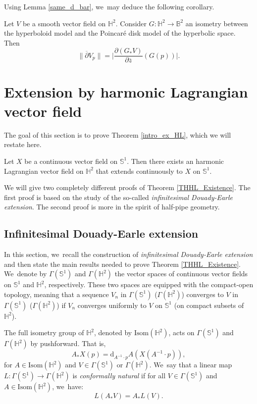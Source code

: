 Using Lemma \ref{same_d_bar}, we~may deduce the following corollary.
\begin{cor}\label{d_bar_isometry}
Let \(V \) be a smooth vector field on \(\mathbb{H}^2\). Consider \(G:\mathbb{H}^2 \to \mathbb{B}^2 \) an isometry between the hyperboloid model and the Poincaré disk model of the hyperbolic space. Then
\[
\lVert \overline{\partial} V_p \rVert = \bigg| \frac{\partial (G_*V)}{\partial \overline{z}}(G(p)) \bigg|.
\]
\end{cor}

\section{Extension by harmonic Lagrangian vector field}\label{sec6_extension}
The goal of this section is to prove Theorem \ref{intro_ex_HL}, which we will restate here.
\begin{theorem}\label{THHL_Existence}
Let $X$ be a continuous vector field on $\mathbb{S}^1$. Then there exists an harmonic Lagrangian vector field on $\mathbb{H}^2$ that extends continuously to $X$ on $\mathbb{S}^1$.
\end{theorem}
We will give two completely different proofs of Theorem \ref{THHL_Existence}. The first proof is based on the study of the so-called \emph{infinitesimal Douady-Earle extension}. The second proof is more in the spirit of half-pipe geometry.

\subsection{Infinitesimal Douady-Earle extension}\label{subsec_inf_DEE}
In this section, we~recall the construction of \emph{infinitesimal Douady-Earle extension} and then state the main results needed to prove Theorem \ref{THHL_Existence}. We~denote by $\Gamma(\mathbb{S}^1)$ and $\Gamma(\mathbb{H}^2)$ the vector spaces of continuous vector fields on $\mathbb{S}^1$ and $\mathbb{H}^2$, respectively. These two spaces are equipped with the compact-open topology, meaning that a sequence $V_n$ in $\Gamma(\mathbb{S}^1)$ (\resp $\Gamma(\mathbb{H}^2)$) converges to $V$ in $\Gamma(\mathbb{S}^1)$ (\resp $\Gamma(\mathbb{H}^2)$) if $V_n$ converges uniformly to $V$ on $\mathbb{S}^1$ (\resp on compact subsets of $\mathbb{H}^2$).

The full isometry group of $\mathbb{H}^2$, denoted by $\mathrm{Isom}(\mathbb{H}^2)$, acts on $\Gamma(\mathbb{S}^1)$ and $\Gamma(\mathbb{H}^2)$ by pushforward. That is,
\[
A_* X(p)=\mathrm{d}_{A^{-1}\cdot p}A(X(A^{-1}\cdot p)),
\]
for $A \in \mathrm{Isom}(\mathbb{H}^2)$ and $V \in \Gamma(\mathbb{S}^1)$ or $\Gamma(\mathbb{H}^2)$. We~say that a linear map $L:\Gamma(\mathbb{S}^1) \to \Gamma(\mathbb{H}^2)$ is \emph{conformally natural} if for all $V \in \Gamma(\mathbb{S}^1)$ and $A \in \mathrm{Isom}(\mathbb{H}^2)$, we~have:
\[
L(A_*V)=A_*L(V).
\]

